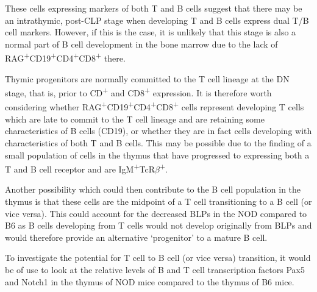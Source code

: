 These cells expressing markers of both T and B cells suggest that there may be an intrathymic, post-CLP stage when developing T and B cells express dual T/B cell markers.
However, if this is the case, it is unlikely that this stage is also a normal part of B cell development in the bone marrow due to the lack of RAG\textsuperscript{+}CD19\textsuperscript{+}CD4\textsuperscript{+}CD8\textsuperscript{+} there.

Thymic progenitors are normally committed to the T cell lineage at the DN stage, that is, prior to CD\textsuperscript{+} and CD8\textsuperscript{+} expression.
It is therefore worth considering whether RAG\textsuperscript{+}CD19\textsuperscript{+}CD4\textsuperscript{+}CD8\textsuperscript{+}  cells represent developing T cells which are late to commit to the T cell lineage and are retaining some characteristics of B cells (CD19), or whether they are in fact cells developing with characteristics of both T and B cells.
This may be possible due to the finding of a small population of cells in the thymus that have progressed to expressing both a T and B cell receptor and are IgM\textsuperscript{+}TcR$\beta$\textsuperscript{+}.

Another possibility which could then contribute to the B cell population in the thymus is that these cells are the midpoint of a T cell transitioning to a B cell (or vice versa).
This could account for the decreased BLPs in the NOD compared to B6 as B cells developing from T cells would not develop originally from BLPs and would therefore provide an alternative `progenitor' to a mature B cell.

To investigate the potential for T cell to B cell (or vice versa) transition, it would be of use to look at the relative levels of B and T cell transcription factors Pax5 and Notch1 in the thymus of NOD mice compared to the thymus of B6 mice.

